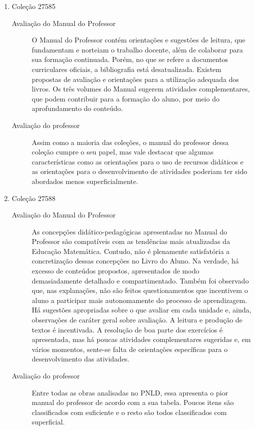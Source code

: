 \documentclass[a4paper, 12pt]{article}
\begin{document}
\begin{enumerate}
\begin{enumerate}
    \item Coleção 27585
      \begin{description}
      \item[Avaliação do Manual do Professor]
        O Manual do Professor contém orientações e sugestões de leitura, que fundamentam  e  norteiam  o  trabalho  docente,  além  de  colaborar  para  sua  formação  continuada. Porém, no que se refere a documentos curriculares oficiais, a bibliografia está  desatualizada.  Existem  propostas  de  avaliação  e  orientações  para  a  utilização adequada dos livros. Os três volumes do Manual sugerem atividades complementares, que podem contribuir para a formação do aluno, por meio do aprofundamento do conteúdo.
      \item[Avaliação do professor]
        Assim como a maioria das coleções, o manual do professor dessa coleção cumpre o seu papel, mas vale destacar que algumas características como as orientações para o uso de recursos didáticos e as orientações para o desenvolvimento de atividades poderiam ter sido abordados menos superficialmente.
      \end{description}
      
    \item Coleção 27588
      \begin{description}
      \item[Avaliação do Manual do Professor]
         As concepções didático-pedagógicas apresentadas no Manual do Professor são compatíveis com as tendências mais atualizadas da Educação Matemática. Contudo, não é plenamente satisfatória a concretização dessas concepções no Livro do Aluno. Na verdade, há excesso de conteúdos propostos, apresentados de modo demasiadamente detalhado e compartimentado. Também foi observado que, nas explanações, não são feitos questionamentos que incentivem o aluno a participar mais autonomamente do processo de aprendizagem. \\
        Há sugestões apropriadas sobre o que avaliar em cada unidade e, ainda, observações de caráter geral sobre avaliação. A leitura e produção de textos é incentivada. A  resolução  de  boa  parte  dos  exercícios  é  apresentada,  mas  há  poucas  atividades complementares sugeridas e, em vários momentos, sente-se falta de orientações específicas para o desenvolvimento das atividades.
      \item[Avaliação do professor]
        Entre todas as obras analisadas no PNLD, essa apresenta o pior manual do professor de acordo com a sua tabela. Poucos itens são classificados com suficiente e o resto são todos classificados com superficial.
      \end{description}
      

\end{enumerate}
\end{enumerate}
\end{document}
